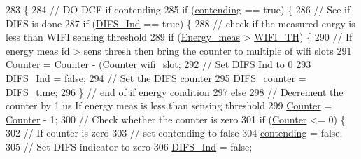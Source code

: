 \begin{DoxyCode}
283                   \{
284     \textcolor{comment}{// DO DCF if contending}
285     \textcolor{keywordflow}{if} (\hyperlink{classAP_afe722094c1dea7972332a788411cc488}{contending} == \textcolor{keyword}{true}) \{
286         \textcolor{comment}{// See if DIFS is done}
287         \textcolor{keywordflow}{if} (\hyperlink{classAP_ae9749297d96e52a95a4f52f795127f8e}{DIFS\_Ind} == \textcolor{keyword}{true}) \{
288             \textcolor{comment}{// check if the measured enrgy is less than WIFI sensing threshold}
289             \textcolor{keywordflow}{if} (\hyperlink{classAP_a71f625e0df8f494e53ab6e27a2e96bd9}{Energy\_meas} > \hyperlink{classAP_a42bd4510621509219054811e7350bf29}{WIFI\_TH}) \{
290                 \textcolor{comment}{// If energy meas id > sens thresh then bring the counter to multiple of wifi slots}
291                 \hyperlink{classAP_a4cf433d4becdf9cb836d170133d9d478}{Counter} = \hyperlink{classAP_a4cf433d4becdf9cb836d170133d9d478}{Counter} - (\hyperlink{classAP_a4cf433d4becdf9cb836d170133d9d478}{Counter} %
      \hyperlink{classAP_a48aa019a03aefd3ee980a9112441234b}{wifi\_slot};
292                 \textcolor{comment}{// Set DIFS Ind to 0}
293                 \hyperlink{classAP_ae9749297d96e52a95a4f52f795127f8e}{DIFS\_Ind} = \textcolor{keyword}{false};
294                 \textcolor{comment}{// Set the DIFS counter}
295                 \hyperlink{classAP_ae8b5098c1fed76aeecdb1ed35f8952a1}{DIFS\_counter} = \hyperlink{classAP_a41453568719c530c6a7376273c02a6fa}{DIFS\_time};
296             \} \textcolor{comment}{// end of if energy condition}
297             \textcolor{keywordflow}{else}
298                 \textcolor{comment}{// Decrement the counter by 1 us If energy meas is less than sensing threshold}
299                 \hyperlink{classAP_a4cf433d4becdf9cb836d170133d9d478}{Counter} = \hyperlink{classAP_a4cf433d4becdf9cb836d170133d9d478}{Counter} - 1;
300             \textcolor{comment}{// Check whether the counter is zero}
301             \textcolor{keywordflow}{if} (\hyperlink{classAP_a4cf433d4becdf9cb836d170133d9d478}{Counter} <= 0) \{
302                 \textcolor{comment}{// If counter is zero}
303                 \textcolor{comment}{// set contending to false}
304                 \hyperlink{classAP_afe722094c1dea7972332a788411cc488}{contending} = \textcolor{keyword}{false};
305                 \textcolor{comment}{// Set DIFS indicator to zero}
306                 \hyperlink{classAP_ae9749297d96e52a95a4f52f795127f8e}{DIFS\_Ind} = \textcolor{keyword}{false};

\end{DoxyCode}
